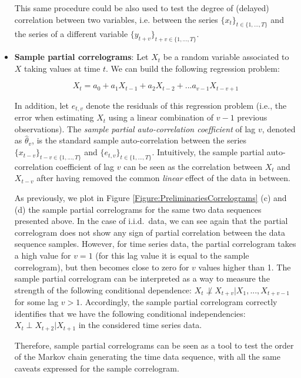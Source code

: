 \begin{itemize}
This same procedure could be also used to test the degree of (delayed) correlation between two variables, i.e. between the series $\{x_t\}_{t\in\{1,...,T\}}$ and the series of a different variable $\{y_{t+v}\}_{t+v\in\{1,...,T\}}$.

\item \textbf{Sample partial correlograms}: Let $X_t$ be a random variable associated to $X$ taking values at time $t$. We can build the following regression problem:

$$ X_t = a_0 + a_1X_{t-1} + a_2X_{t-2} + ... a_{v-1}X_{t-v+1}$$

In addition, let $e_{t,v}$ denote the residuals of this regression problem (i.e., the error when estimating $X_t$ using a linear combination of $v-1$ previous observations). The \emph{sample partial auto-correlation coefficient} of lag $v$, denoted as  $\hat{\theta}_v$, is the standard sample auto-correlation between the series $\{x_{t-v}\}_{t-v\in\{1,...,T\}}$ and $\{e_{t,v}\}_{t\in\{1,...,T\}}$. Intuitively, the sample partial auto-correlation coefficient of lag $v$ can be seen as the correlation between $X_t$ and $X_{t-v}$ after having removed the common \emph{linear} effect of the data in between.

As previously, we plot in Figure \ref{Figure:PreliminariesCorrelograms} (c) and (d) the sample partial correlograms for the same two data sequences presented above. In the case of i.i.d.\ data, we can see again that the partial correlogram does not show any sign of partial correlation between the data sequence samples. However, for time series data, the partial correlogram takes a high value for $v=1$ (for this lag value it is equal to the sample correlogram), but then becomes close to zero for $v$ values higher than 1. The sample partial correlogram can be interpreted as a way to measure the strength of the following conditional dependence: $X_t  \not\perp X_{t+v} | X_1,...,X_{t+v-1}$ for some lag $v>1$. Accordingly, the sample partial correlogram correctly identifies that we have the following conditional independencies: $X_t\perp X_{t+2}|X_{t+1}$ in the considered time series data. 

Therefore, sample partial correlograms can be seen as a tool to test the order of the Markov chain generating the time data sequence, with all the same caveats expressed for the sample correlogram. 


\end{itemize}
